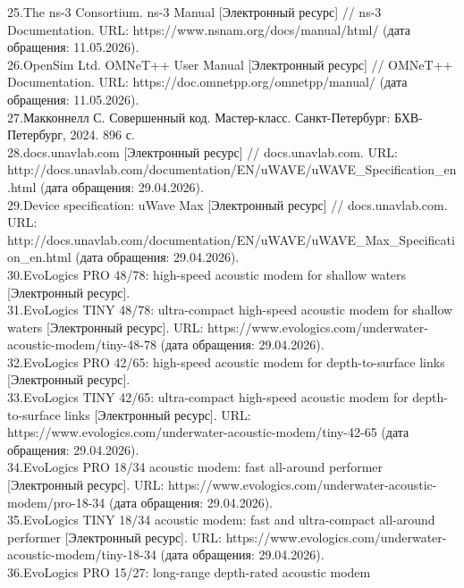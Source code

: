 \documentclass[
    numbers=section,
    document-code={ВКРБ--09.03.04--10.19--XX--26--81}
]{../latex/fqw}
\begin{document}
{        25.The ns-3 Consortium. ns-3 Manual {[}Электронный ресурс{]} // ns-3
        Documentation. URL: https://www.nsnam.org/docs/manual/html/ (дата
        обращения: 11.05.2026).\\
        26.OpenSim Ltd. OMNeT++ User Manual {[}Электронный ресурс{]} // OMNeT++
        Documentation. URL: https://doc.omnetpp.org/omnetpp/manual/ (дата
        обращения: 11.05.2026).\\
        27.Макконнелл С. Совершенный код. Мастер-класс. Санкт-Петербург:
        БХВ-Петербург, 2024. 896 с.\\
        28.docs.unavlab.com {[}Электронный ресурс{]} // docs.unavlab.com. URL:
        http://docs.unavlab.com/documentation/EN/uWAVE/uWAVE\_Specification\_en.html
        (дата обращения: 29.04.2026).\\
        29.Device specification: uWave Max {[}Электронный ресурс{]} //
        docs.unavlab.com. URL:
        http://docs.unavlab.com/documentation/EN/uWAVE/uWAVE\_Max\_Specification\_en.html
        (дата обращения: 29.04.2026).\\
        30.EvoLogics PRO 48/78: high-speed acoustic modem for shallow waters
            {[}Электронный ресурс{]}.\\
        31.EvoLogics TINY 48/78: ultra-compact high-speed acoustic modem for
        shallow waters {[}Электронный ресурс{]}. URL:
        https://www.evologics.com/underwater-acoustic-modem/tiny-48-78 (дата
        обращения: 29.04.2026).\\
        32.EvoLogics PRO 42/65: high-speed acoustic modem for depth-to-surface
        links {[}Электронный ресурс{]}.\\
        33.EvoLogics TINY 42/65: ultra-compact high-speed acoustic modem for
        depth-to-surface links {[}Электронный ресурс{]}. URL:
        https://www.evologics.com/underwater-acoustic-modem/tiny-42-65 (дата
        обращения: 29.04.2026).\\
        34.EvoLogics PRO 18/34 acoustic modem: fast all-around performer
            {[}Электронный ресурс{]}. URL:
        https://www.evologics.com/underwater-acoustic-modem/pro-18-34 (дата
        обращения: 29.04.2026).\\
        35.EvoLogics TINY 18/34 acoustic modem: fast and ultra-compact
        all-around performer {[}Электронный ресурс{]}. URL:
        https://www.evologics.com/underwater-acoustic-modem/tiny-18-34 (дата
        обращения: 29.04.2026).\\
        36.EvoLogics PRO 15/27: long-range depth-rated acoustic modem
}
\end{document}

